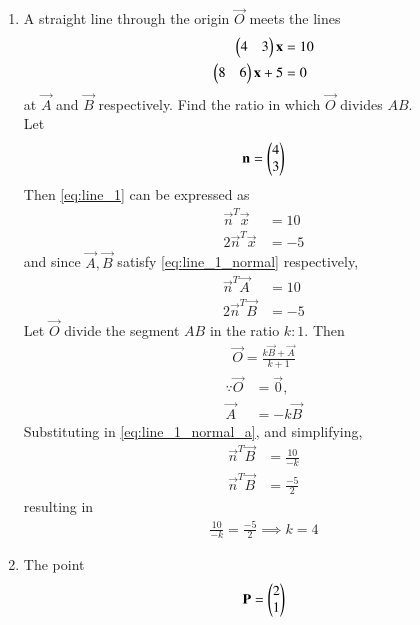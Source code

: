 \renewcommand{\theequation}{\theenumi}

\begin{enumerate}[label=\arabic*.,ref=\thesubsection.\theenumi]
\item A straight line through the origin   $\vec{O}$ meets the lines
\begin{align} 
\label{eq:line_1}
\begin{pmatrix}4 & 3\end{pmatrix}\mathbf{x} &= 10
\\
\begin{pmatrix}8 & 6\end{pmatrix}\mathbf{x} +5&= 0
\end{align} 
%
at $\vec{A}$ and $\vec{B}$ respectively.  Find the ratio in which  $\vec{O}$ divides $AB$.
\\
\solution Let 
\begin{align} 
\mathbf{n} =\begin{pmatrix}4 \\ 3\end{pmatrix}
\end{align} 
%
Then \eqref{eq:line_1} can be expressed as
\begin{align} 
\label{eq:line_1_normal}
\vec{n}^T\vec{x} &= 10
\\
2\vec{n}^T\vec{x} &= -5
\end{align} 
%
and since $\vec{A}, \vec{B}$ satisfy \eqref{eq:line_1_normal} respectively,
\begin{align} 
\label{eq:line_1_normal_a}
\vec{n}^T\vec{A} &= 10
\\
2\vec{n}^T\vec{B} &= -5
\label{eq:line_1_normal_b}
\end{align} 
%
Let  $\vec{O}$ divide the segment $AB$ in the ratio $k:1$. Then
\begin{align} 
\label{eq:line_1_section}
\vec{O}=\frac{k\vec{B} +\vec{A} }{k+1}
\end{align} 
%
\begin{align} 
\because \vec{O}&= \vec{0},
\\
\vec{A} &=-k\vec{B}
\end{align} 
%
Substituting in \eqref{eq:line_1_normal_a}, and simplifying, 
\begin{align} 
\label{eq:line_1_normal_subs_a}
\vec{n}^T\vec{B} &= \frac{10}{-k}
\\
\vec{n}^T\vec{B} &= \frac{-5}{2}
\end{align} 
resulting in 
\begin{align} 
\frac{10}{-k} = \frac{-5}{2} \implies k = 4
\end{align} 
\item The 
point 
\begin{equation} 
\mathbf{P}=\begin{pmatrix}2\\ 1\end{pmatrix} 
\end{equation} 

\end{enumerate}
